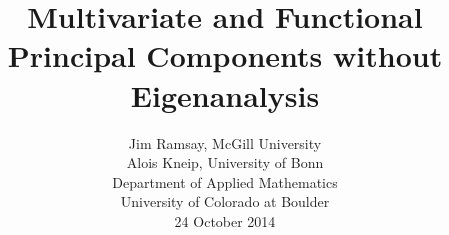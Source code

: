 \documentclass[11pt]{beamer}
\title{Multivariate and Functional Principal Components without Eigenanalysis}
\author{Jim Ramsay, McGill University   \\
        Alois Kneip, University of Bonn \\
      Department of Applied Mathematics \\
      University of Colorado at Boulder \\
      24 October 2014}
\date{}
\begin{document}

\begin{frame}

\maketitle

\end{frame}

%
%
%
%
%
%
%
%
%
%
%
%
%
%
%
\end{document}
